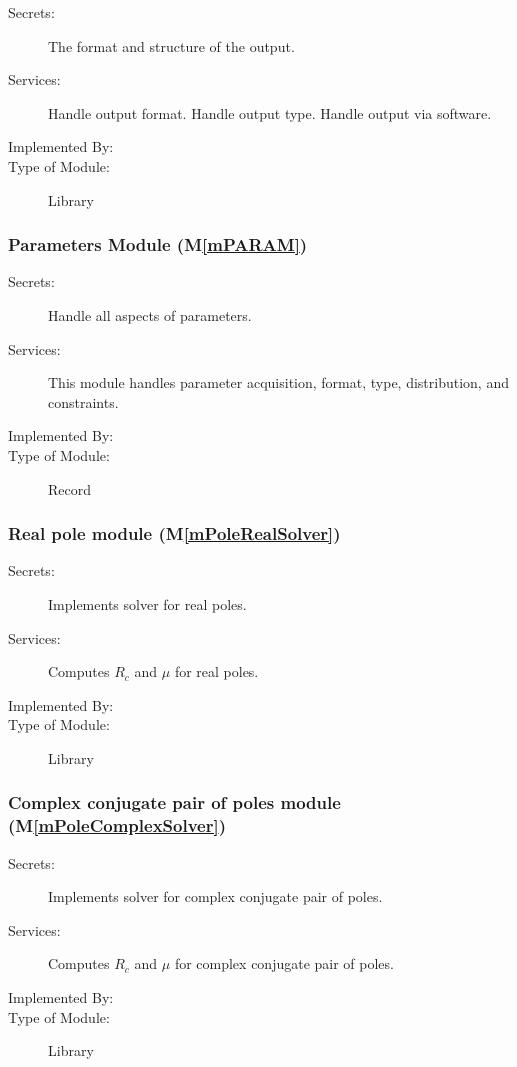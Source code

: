 \documentclass[12pt, titlepage]{article}
\newcommand{\mref}[1]{M\ref{#1}}
\begin{document}
\begin{description}
\item[Secrets:] The format and structure of the output.
\item[Services:] Handle output format. Handle output type. Handle output via software.
\item[Implemented By:] 
\item[Type of Module:] Library
\end{description}

\subsubsection{Parameters Module (\mref{mPARAM})}

\begin{description}
\item[Secrets:] Handle all aspects of parameters.
\item[Services:] This module handles parameter acquisition, format, type, distribution, and constraints.
\item[Implemented By:] 
\item[Type of Module:] Record
\end{description}

\subsubsection{Real pole module (\mref{mPoleRealSolver})}

\begin{description}
\item[Secrets:] Implements solver for real poles.
\item[Services:] Computes $R_c$ and $\mu$ for real poles.
\item[Implemented By:] 
\item[Type of Module:] Library
\end{description}

\subsubsection{Complex conjugate pair of poles module (\mref{mPoleComplexSolver})}

\begin{description}
\item[Secrets:] Implements solver for complex conjugate pair of poles.
\item[Services:] Computes $R_c$ and $\mu$ for complex conjugate pair of poles.
\item[Implemented By:] 
\item[Type of Module:] Library
\end{description}
\end{document}
